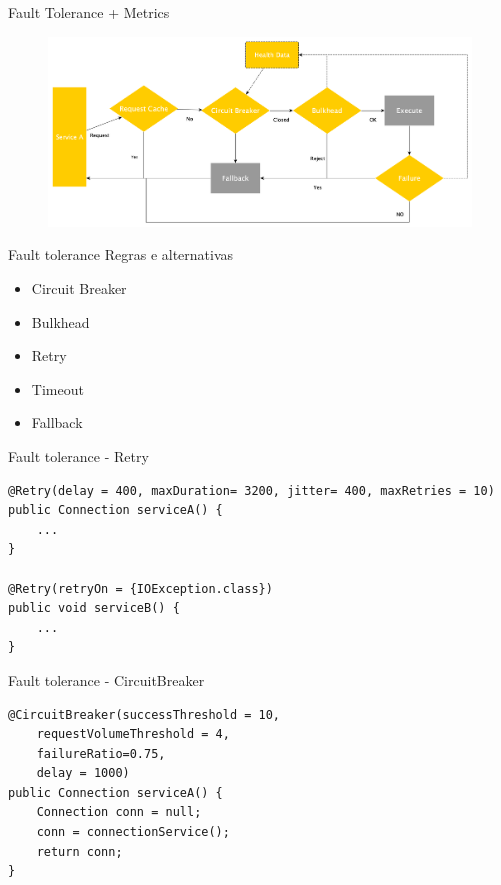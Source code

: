 \documentclass[aspectratio=169]{beamer}
\begin{document}
\begin{frame}{Fault Tolerance + Metrics}

\begin{figure}
	\centering
	\includegraphics[width=0.9\linewidth]{Images/falldata}
\end{figure}

\end{frame}


\begin{frame}{Fault tolerance}
Regras e alternativas
\begin{itemize}
\item Circuit Breaker
\item Bulkhead
\item Retry
\item Timeout
\item Fallback
\end{itemize}

\end{frame}

\begin{frame}[fragile]{Fault tolerance - Retry}
\begin{lstlisting}
@Retry(delay = 400, maxDuration= 3200, jitter= 400, maxRetries = 10)
public Connection serviceA() {
	...
}

@Retry(retryOn = {IOException.class})
public void serviceB() {
	...
}
\end{lstlisting}
\end{frame}

\begin{frame}[fragile]{Fault tolerance - CircuitBreaker}
\begin{lstlisting}
@CircuitBreaker(successThreshold = 10,
	requestVolumeThreshold = 4,
	failureRatio=0.75,
	delay = 1000)
public Connection serviceA() {
	Connection conn = null;
	conn = connectionService();
	return conn;
}
\end{lstlisting}
\end{frame}
\end{document}
